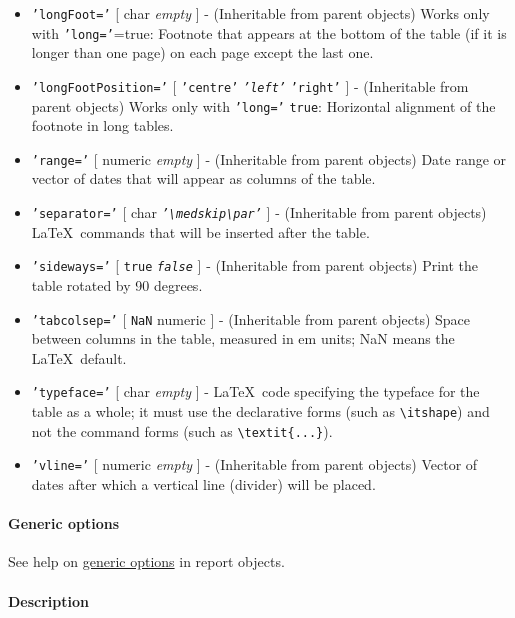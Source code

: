 \begin{itemize}
 \item
   \texttt{'longFoot='} {[} char \textbar{} \emph{empty} {]} -
   (Inheritable from parent objects) Works only with
   \texttt{'long='}=true: Footnote that appears at the bottom of the
   table (if it is longer than one page) on each page except the last
   one.
 \item
   \texttt{'longFootPosition='} {[} \texttt{'centre'} \textbar{}
   \emph{\texttt{'left'}} \textbar{} \texttt{'right'} {]} - (Inheritable
   from parent objects) Works only with \texttt{'long='} \texttt{true}:
   Horizontal alignment of the footnote in long tables.
 \item
   \texttt{'range='} {[} numeric \textbar{} \emph{empty} {]} -
   (Inheritable from parent objects) Date range or vector of dates that
   will appear as columns of the table.
 \item
   \texttt{'separator='} {[} char \textbar{}
   \emph{\texttt{'\textbackslash{}medskip\textbackslash{}par'}} {]} -
   (Inheritable from parent objects) \LaTeX~commands that will be
   inserted after the table.
 \item
   \texttt{'sideways='} {[} \texttt{true} \textbar{}
   \emph{\texttt{false}} {]} - (Inheritable from parent objects) Print
   the table rotated by 90 degrees.
 \item
   \texttt{'tabcolsep='} {[} \texttt{NaN} \textbar{} numeric {]} -
   (Inheritable from parent objects) Space between columns in the table,
   measured in em units; NaN means the \LaTeX~default.
 \item
   \texttt{'typeface='} {[} char \textbar{} \emph{empty} {]} -
   \LaTeX~code specifying the typeface for the table as a whole; it must
   use the declarative forms (such as \texttt{\textbackslash{}itshape})
   and not the command forms (such as
   \texttt{\textbackslash{}textit\{...\}}).
 \item
   \texttt{'vline='} {[} numeric \textbar{} \emph{empty} {]} -
   (Inheritable from parent objects) Vector of dates after which a
   vertical line (divider) will be placed.
 \end{itemize}
 
 \paragraph{Generic options}
 
 See help on \href{report/Contents}{generic options} in report objects.
 
 \paragraph{Description}
 
